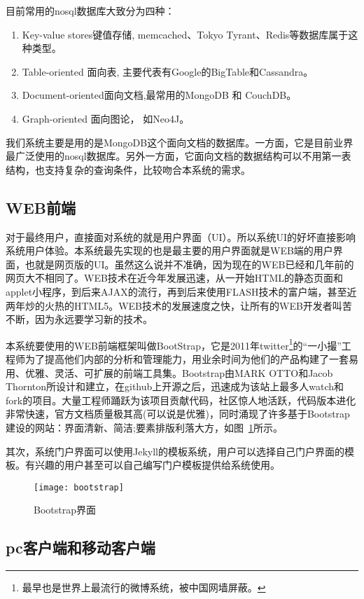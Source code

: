 目前常用的nosql数据库大致分为四种：
\begin{enumerate}
\item Key-value stores键值存储, memcached、Tokyo Tyrant、Redis等数据库属于这种类型。
\item Table-oriented 面向表, 主要代表有Google的BigTable和Cassandra。
\item Document-oriented面向文档,最常用的MongoDB 和 CouchDB。
\item Graph-oriented 面向图论， 如Neo4J。
\end{enumerate}
我们系统主要是用的是MongoDB\cite{banker2011mongodb,chodorow2010mongodb,wei2011using}这个面向文档的数据库。一方面，它是目前业界最广泛使用的nosql数据库。另外一方面，它面向文档的数据结构可以不用第一表结构，也支持复杂的查询条件，比较吻合本系统的需求。

\subsection{WEB前端}
\label{sec:webui}

对于最终用户，直接面对系统的就是用户界面（UI）。所以系统UI的好坏直接影响系统用户体验。本系统最先实现的也是最主要的用户界面就是WEB端的用户界面，也就是网页版的UI。虽然这么说并不准确，因为现在的WEB已经和几年前的网页大不相同了。WEB技术在近今年发展迅速，从一开始HTML的静态页面和applet小程序，到后来AJAX的流行，再到后来使用FLASH技术的富户端，甚至近两年炒的火热的HTML5。WEB技术的发展速度之快，让所有的WEB开发者叫苦不断，因为永远要学习新的技术。

本系统要使用的WEB前端框架叫做BootStrap，它是2011年twitter\footnote{最早也是世界上最流行的微博系统，被中国网墙屏蔽。}的“一小撮”工程师为了提高他们内部的分析和管理能力，用业余时间为他们的产品构建了一套易用、优雅、灵活、可扩展的前端工具集。Bootstrap由MARK OTTO和Jacob Thornton所设计和建立，在github上开源之后，迅速成为该站上最多人watch和fork的项目。大量工程师踊跃为该项目贡献代码，社区惊人地活跃，代码版本进化非常快速，官方文档质量极其高(可以说是优雅)，同时涌现了许多基于Bootstrap建设的网站：界面清新、简洁;要素排版利落大方，如图~\ref{fig:xfig14}所示。

其次，系统门户界面可以使用Jekyll的模板系统，用户可以选择自己门户界面的模板。有兴趣的用户甚至可以自己编写门户模板提供给系统使用。

\begin{figure}[H]
  \centering
  \texttt{[image: bootstrap]}
  \caption{Bootstrap界面}
  \label{fig:xfig14}
\end{figure}

\subsection{pc客户端和移动客户端}
\label{sec:pcandriodmac}

